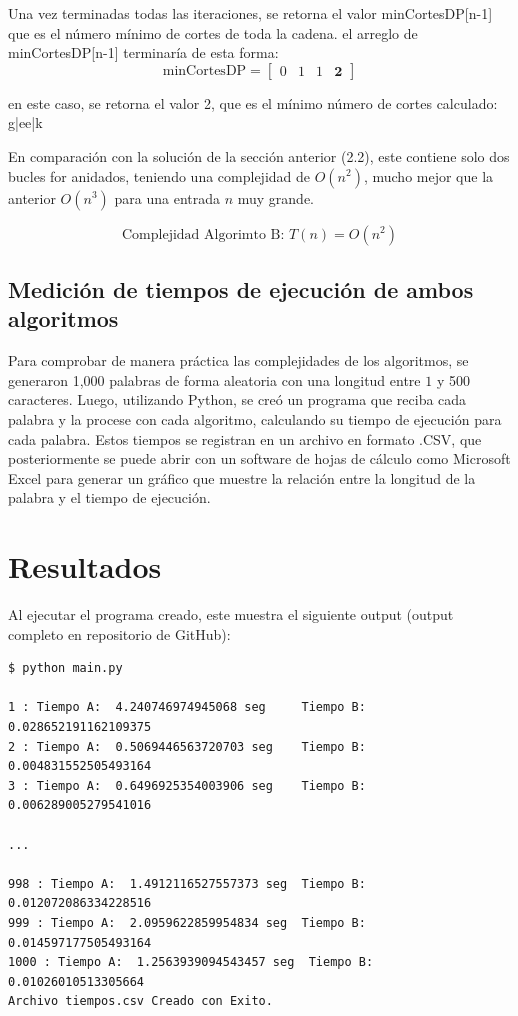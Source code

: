 \documentclass[12pt]{article}
\begin{document}
Una vez terminadas todas las iteraciones, se retorna el valor minCortesDP[n-1] que es el número mínimo de cortes de toda la cadena. el arreglo de minCortesDP[n-1] terminaría de esta forma:
$$ \text{minCortesDP} = \begin{bmatrix}
0 & 1& 1 & \textbf{2} 
\end{bmatrix}  $$

en este caso, se retorna el valor 2, que es el mínimo número de cortes calculado: g|ee|k

En comparación con la solución de la sección anterior (2.2), este contiene solo dos bucles for anidados, teniendo una complejidad de $O(n^2)$, mucho mejor que la anterior $O(n^3)$ para una entrada $n$ muy grande.

$$\text{Complejidad Algorimto B: } T(n) = O(n^2)$$

\subsection{Medición de tiempos de ejecución de ambos algoritmos}
Para comprobar de manera práctica las complejidades de los algoritmos, se generaron 1,000 palabras de forma aleatoria con una longitud entre $1$ y 500 caracteres. Luego, utilizando Python, se creó un programa que reciba cada palabra y la procese con cada algoritmo, calculando su tiempo de ejecución para cada palabra. Estos tiempos se registran en un archivo en formato .CSV, que posteriormente se puede abrir con un software de hojas de cálculo como Microsoft Excel para generar un gráfico que muestre la relación entre la longitud de la palabra y el tiempo de ejecución.


\section{Resultados}

Al ejecutar el programa creado, este muestra el siguiente output (output completo en repositorio de GitHub):

\begin{verbatim}
$ python main.py

1 : Tiempo A:  4.240746974945068 seg     Tiempo B: 0.028652191162109375
2 : Tiempo A:  0.5069446563720703 seg    Tiempo B: 0.004831552505493164
3 : Tiempo A:  0.6496925354003906 seg    Tiempo B: 0.006289005279541016

...

998 : Tiempo A:  1.4912116527557373 seg  Tiempo B: 0.012072086334228516
999 : Tiempo A:  2.0959622859954834 seg  Tiempo B: 0.014597177505493164
1000 : Tiempo A:  1.2563939094543457 seg  Tiempo B: 0.01026010513305664
Archivo tiempos.csv Creado con Exito.
\end{verbatim}
\end{document}
